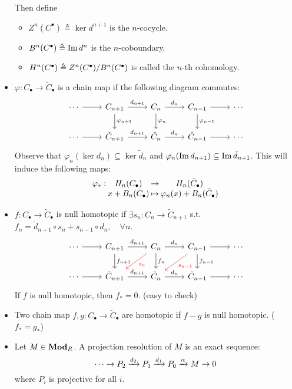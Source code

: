\begin{definition}
\begin{itemize}
      Then define
      \begin{itemize}
        \item $Z^n(C^\bullet) \triangleq \ker d^{n+1}$ is the $n$-cocycle.
        \item $B^n(C^\bullet) \triangleq \operatorname{Im} d^n$ is the $n$-coboundary.
        \item $H^n(C^\bullet) \triangleq {Z^n(C^\bullet)}/{B^n(C^\bullet)}$
          is called the $n$-th cohomology.
      \end{itemize}
    \item $\varphi: C_\bullet \to \tilde C_\bullet$ is a chain map if the
      following diagram commutes:
      \[
      \begin{tikzcd}
        \dotsm \ar[r] & C_{n+1} \ar[r, "d_{n+1}"] \ar[d, "\varphi_{n+1}"]
                      & C_n \ar[r, "d_n"] \ar[d, "\varphi_n"]
                      & C_{n-1} \ar[r] \ar[d, "\varphi_{n-1}"]
                      & \dotsm \\
        \dotsm \ar[r] & \tilde C_{n+1} \ar[r, "d_{n+1}"] & \tilde C_n \ar[r, "d_n"]
                      & \tilde C_{n-1} \ar[r] & \dotsm
      \end{tikzcd}
      \]
      Observe that $\varphi_n(\ker d_n) \subseteq \ker \tilde d_n$ and
      $\varphi_n(\operatorname{Im} d_{n+1}) \subseteq \operatorname{Im} \tilde d_{n+1}$.
      This will induce the following maps:
      \[
        \deffunc{\varphi_*}{H_n(C_\bullet)}{H_n(\tilde C_\bullet)}
        {x + B_n(C_\bullet)}{\varphi_n(x) + B_n(\tilde C_\bullet)}
      \]
    \item $f: C_\bullet \to \tilde C_\bullet$ is null homotopic if
      $\exists s_n: C_n \to \tilde C_{n+1}$ s.t.
      $f_n = \tilde d_{n+1} \circ s_n + s_{n-1} \circ d_n, \quad \forall n$.
      \[
      \begin{tikzcd}
        \dotsm \ar[r] & C_{n+1} \ar[r, "d_{n+1}"] \ar[d, "f_{n+1}"]
                      & C_n \ar[r, "d_n"] \ar[d, "f_n"] \ar[ld, red, "s_n" red]
                      & C_{n-1} \ar[r] \ar[d, "f_{n-1}"]  \ar[ld, red, "s_{n-1}" red]
                      & \dotsm \\
        \dotsm \ar[r] & \tilde C_{n+1} \ar[r, "d_{n+1}"] & \tilde C_n \ar[r, "d_n"]
                      & \tilde C_{n-1} \ar[r] & \dotsm
      \end{tikzcd}
      \]
      If $f$ is null homotopic, then $f_* = 0$. (easy to check)
    \item Two chain map $f, g: C_\bullet \to \tilde C_\bullet$ are homotopic
      if $f - g$ is null homotopic. ($f_* = g_*$)
    \item Let $M \in \mathbf{Mod}_R$. A projection resolution of $M$ is an exact sequence:
      \[
        \dotsm \to P_2 \xrightarrow{d_2} P_1 \xrightarrow{d_1} P_0 \xrightarrow{\alpha} M \to 0
      \]
      where $P_i$ is projective for all $i$.
  \end{itemize}
\end{definition}

